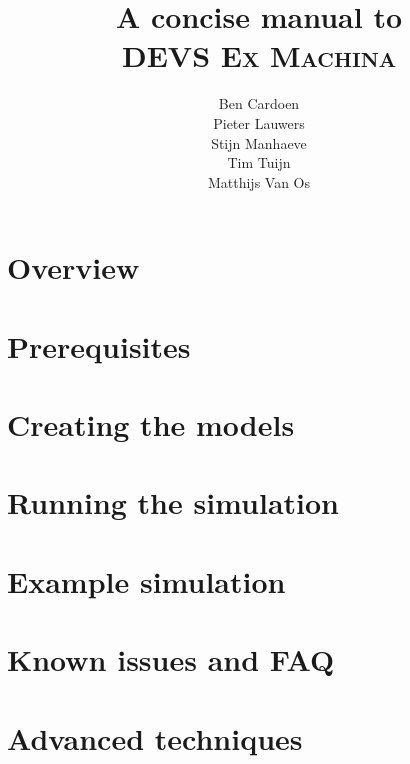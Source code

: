 \documentclass[10pt,a4paper]{report}
\title{A concise manual to\\\textsc{DEVS Ex Machina}}
\author{Ben Cardoen\\Pieter Lauwers\\Stijn Manhaeve\\Tim Tuijn\\Matthijs Van Os}
\date{}
\begin{document}
\maketitle
\tableofcontents{}

\chapter{Overview}


\chapter{Prerequisites}

\chapter{Creating the models}


\chapter{Running the simulation}


\appendix
\chapter{Example simulation}

\chapter{Known issues and FAQ}

\chapter{Advanced techniques}
\end{document}
